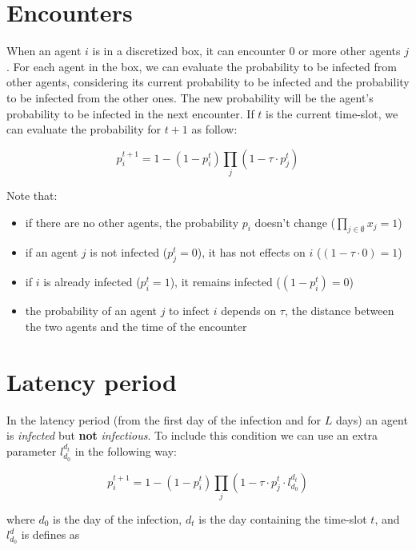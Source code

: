 \documentclass[12pt, a4paper]{article}
\newcommand{\expr}[1]{\left(#1\right)}
\begin{document}
\section{Encounters}

When an agent $i$ is in a discretized box, it can encounter 0 or more other agents $j$. For each agent in the box, we can evaluate the probability to be infected from other agents, considering its current probability to be infected and the probability to be infected from the other ones. The new probability will be the agent's probability to be infected in the next encounter. If $t$ is the current time-slot, we can evaluate the probability for $t+1$ as follow:

\begin{equation}\label{eq:nextprob}
     p_{i}^{t+1} = 1 - \expr{1 - p_i^t} \prod_{j}\expr{1 - \tau{}\cdot{p_j^t}}
\end{equation}


Note that:
\begin{itemize}
    \item if there are no other agents, the probability $p_i$ doesn't change ($\prod_{j \in \emptyset{}}x_j = 1$)
    \item if an agent $j$ is not infected ($p_j^t=0$), it has not effects on $i$ ($(1 - \tau{}\cdot{0}) = 1$)
    \item if $i$ is already infected ($p_i^t=1$), it remains infected ($(1 - p_i^t)=0$)
    \item the probability of an agent $j$ to infect $i$ depends on $\tau$, the distance between the two agents and the time of the encounter
\end{itemize}

\section{Latency period}

In the latency period (from the first day of the infection and for $L$ days) an agent is \textit{infected} but \textbf{not} \textit{infectious}. To include this condition we can use an extra parameter $l_{d_0}^{d_t}$ in the following way:

\begin{equation}\label{eq:nextprob1}
     p_{i}^{t+1} = 1 - \expr{1 - p_i^t} \prod_{j}\expr{1 - \tau{}\cdot{p_j^t}\cdot{l_{d_0}^{d_t}}}
\end{equation}

where $d_0$ is the day of the infection, $d_t$ is the day containing the time-slot $t$, and $l_{d_0}^d$ is defines as
\end{document}
